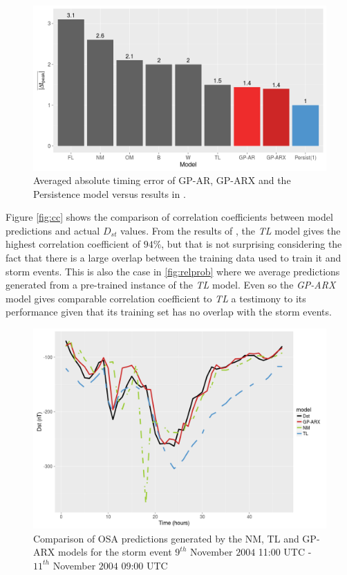\documentclass[referee,a4paper,12pt,traditabstract]{swsc}
\begin{document}
\begin{linenumbers}
\begin{figure}
   \centering
   \includegraphics[width=\textwidth]{Compare_timingerr.png}
      \caption{Averaged absolute timing error of GP-AR, GP-ARX and the Persistence model versus results in \citet{Ji2012}.}
         \label{fig:timingErr}
   \end{figure}




Figure \ref{fig:cc} shows the comparison of correlation coefficients between model predictions and actual $D_{st}$ values. From the results of \citet{Ji2012}, the \emph{TL} model gives the highest correlation coefficient of $94\%$, but that is not surprising considering the fact that there is a large overlap between the training data used to train it and storm events. This is also the case in \ref{fig:relprob} where we average predictions generated from a pre-trained instance of the \emph{TL} model. Even so the \emph{GP-ARX} model gives comparable correlation coefficient to \emph{TL} a testimony to its performance given that its training set has no overlap with the storm events.

\begin{figure}
   \centering
   \includegraphics[width=\textwidth]{Compare_pred.png}
      \caption{Comparison of OSA predictions generated by the NM, TL and GP-ARX models for the storm event $9^{th}$ November $2004$ 11:00 UTC - $11^{th}$ November $2004$ 09:00 UTC}
         \label{fig:predictions}
\end{figure}



\end{linenumbers}
\end{document}
